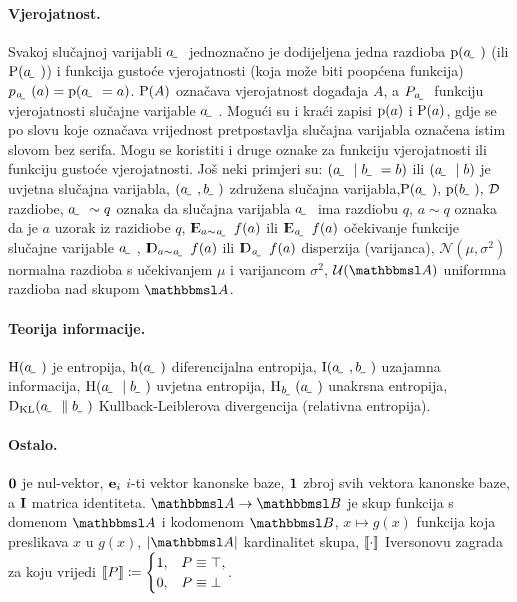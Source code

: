 \documentclass[oneside]{book}
\begin{document}
\paragraph{Vjerojatnost.} Svakoj slučajnoj varijabli $\rvar a$ jednoznačno je dodijeljena jedna razdioba $\p(\rvar a)$ (ili $\P(\rvar a)$) i funkcija gustoće vjerojatnosti (koja može biti poopćena funkcija) $p_{\rvar a}(a)=\p(\rvar a=a)$. $\P(A)$ označava vjerojatnost događaja $A$, a $P_{\rvar a}$ funkciju vjerojatnosti slučajne varijable $\rvar a$. Mogući su i kraći zapisi $\p(a)$ i $\P(a)$, gdje se po slovu koje označava vrijednost pretpostavlja slučajna varijabla označena istim slovom bez serifa. Mogu se koristiti i druge oznake za funkciju vjerojatnosti ili funkciju gustoće vjerojatnosti. Još neki primjeri su: $(\rvar a\mid\rvar b= b)$ ili $(\rvar a\mid b)$ je uvjetna slučajna varijabla, $(\rvar a,\rvar b)$ združena slučajna varijabla,$\P(\rvar a),\,\p(\rvar b),\,\mathcal{D}$ razdiobe, 
$\rvar a \sim q$ oznaka da slučajna varijabla $\rvar a$ ima razdiobu $q$, $a\sim q$ oznaka da je $a$ uzorak iz razidiobe $q$,
$\E_{a\sim\rvar a} f(a)$ ili $\E_{\rvar a} f(a)$ očekivanje funkcije slučajne varijable $\rvar a$, $\D_{a\sim\rvar a} f(a)$ ili $\D_{\rvar a} f(a)$ disperzija (varijanca),  $\mathcal{N}(\mu, \sigma^2)$ normalna razdioba s učekivanjem $\mu$ i varijancom $\sigma^2$, 
$\mathcal{U}(\set A)$
uniformna razdioba nad skupom $\set A$.

\paragraph{Teorija informacije.}
$\H(\rvar a)$ je entropija, 
$\h(\rvar a)$
diferencijalna entropija, 
$\I(\rvar a,\rvar b)$
uzajamna informacija, 
$\H(\rvar a\mid\rvar b)$ 
uvjetna entropija, 
$\H_{\rvar b}(\rvar a)$ 
unakrsna entropija, 
$\Dkl{\rvar a}{\rvar b}$ 
Kullback-Leiblerova divergencija (relativna entropija).

\paragraph{Ostalo.}
$\cvec 0$ je nul-vektor, $\cvec e_i$ $i$-ti vektor kanonske baze, $\cvec 1$ zbroj svih vektora kanonske baze, a $\cvec I$ matrica identiteta.
$\set A\to\set B$ je skup funkcija s domenom $\set A$ i kodomenom $\set B$, $x\mapsto g(x)$ funkcija koja preslikava $x$ u $g(x)$, $\envert{\set A}$ kardinalitet skupa, $\enbbracket{\cdot}$
Iversonovu zagrada za koju vrijedi $\enbbracket{P}\coloneqq\begin{cases} 1, & P \equiv \top, \\ 0, & P \equiv \bot \end{cases}$. 
\end{document}
